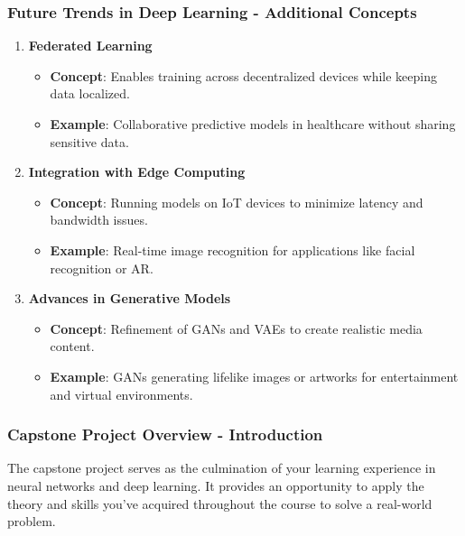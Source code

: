 \documentclass[aspectratio=169]{beamer}
\begin{document}
\begin{frame}[fragile]
    \frametitle{Future Trends in Deep Learning - Additional Concepts}
    \begin{enumerate}
        \item \textbf{Federated Learning}
            \begin{itemize}
                \item \textbf{Concept}: Enables training across decentralized devices while keeping data localized.
                \item \textbf{Example}: Collaborative predictive models in healthcare without sharing sensitive data.
            \end{itemize}

        \item \textbf{Integration with Edge Computing}
            \begin{itemize}
                \item \textbf{Concept}: Running models on IoT devices to minimize latency and bandwidth issues.
                \item \textbf{Example}: Real-time image recognition for applications like facial recognition or AR.
            \end{itemize}
        
        \item \textbf{Advances in Generative Models}
            \begin{itemize}
                \item \textbf{Concept}: Refinement of GANs and VAEs to create realistic media content.
                \item \textbf{Example}: GANs generating lifelike images or artworks for entertainment and virtual environments.
            \end{itemize}
    \end{enumerate}
\end{frame}

\begin{frame}[fragile]
    \frametitle{Capstone Project Overview - Introduction}
    The capstone project serves as the culmination of your learning experience in neural networks and deep learning. 
    It provides an opportunity to apply the theory and skills you've acquired throughout the course to solve a real-world problem.
\end{frame}
\end{document}
